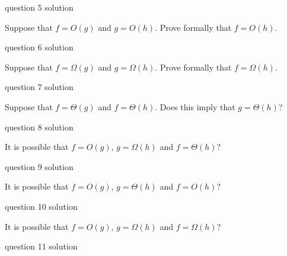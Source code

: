 \documentclass[12pt]{article}
\begin{document}
\begin{solution}
question 5 solution
\end{solution}

\begin{question}
Suppose that $f = O(g)$ and $g = O(h)$. Prove formally that $f = O(h)$.
\end{question}

\begin{solution}
question 6 solution
\end{solution}

\begin{question}
Suppose that $f = \Omega(g)$ and $g = \Omega(h)$. Prove formally that $f = \Omega(h)$.
\end{question}

\begin{solution}
question 7 solution
\end{solution}

\begin{question}
Suppose that $f = \Theta(g)$ and $f = \Theta(h)$. Does this imply that $g = \Theta(h)$?
\end{question}

\begin{solution}
question 8 solution
\end{solution}

\begin{question}
It is possible that $f = O(g)$, $g = \Omega(h)$ and $f = \Theta(h)$?
\end{question}

\begin{solution}
question 9 solution
\end{solution}

\begin{question}
It is possible that $f = O(g)$, $g = \Theta(h)$ and $f = O(h)$?
\end{question}

\begin{solution}
question 10 solution
\end{solution}

\begin{question}
It is possible that $f = O(g)$, $g = \Omega(h)$ and $f = \Omega(h)$?
\end{question}

\begin{solution}
question 11 solution
\end{solution}
\end{document}
